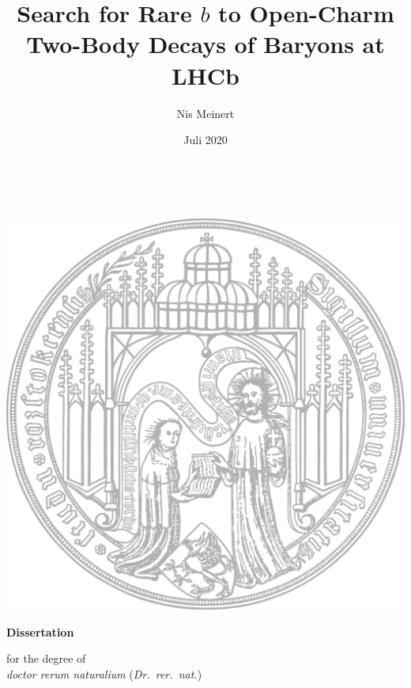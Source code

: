 \documentclass[%
a4paper,%
chapterprefix,%
numbers=noenddot,%
10pt,%
caption=tableheading]{scrbook}
\begin{document}

\subject{Dissertation}
\title{Search for Rare $b$ to Open-Charm Two-Body Decays of Baryons at LHCb}
\author{Nis Meinert}
\date{Juli 2020}

\makeatletter
\begin{titlepage}
    \begin{center}
        {\hphantom{42}}

        \\
        \vspace{.3cm}

        \vspace{1cm}

        \includegraphics[scale=1.]{unilogo.png}

        \vspace{1cm}

        {\textbf{\Large Dissertation}}

        \vspace{.5cm}

        {for the degree of \\ \textit{doctor rerum naturalium} (\textit{Dr.\ rer.\ nat.})}


\end{center}
\end{titlepage}
\end{document}
